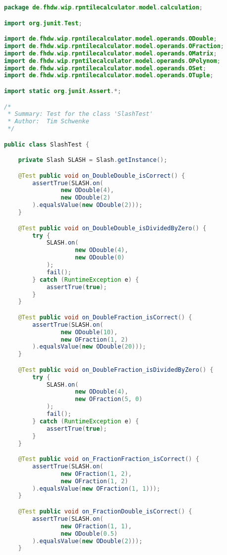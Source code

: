 \begin{lstlisting}[caption=SlashTest (Schwenke),label=list:SlashTest,language=Java]
package de.fhdw.wip.rpntilecalculator.model.calculation;

import org.junit.Test;

import de.fhdw.wip.rpntilecalculator.model.operands.ODouble;
import de.fhdw.wip.rpntilecalculator.model.operands.OFraction;
import de.fhdw.wip.rpntilecalculator.model.operands.OMatrix;
import de.fhdw.wip.rpntilecalculator.model.operands.OPolynom;
import de.fhdw.wip.rpntilecalculator.model.operands.OSet;
import de.fhdw.wip.rpntilecalculator.model.operands.OTuple;

import static org.junit.Assert.*;

/*
 * Summary: Test for the class 'SlashTest'
 * Author:  Tim Schwenke
 */

public class SlashTest {

    private Slash SLASH = Slash.getInstance();

    @Test public void on_DoubleDouble_isCorrect() {
        assertTrue(SLASH.on(
                new ODouble(4),
                new ODouble(2)
        ).equalsValue(new ODouble(2)));
    }

    @Test public void on_DoubleDouble_isDividedByZero() {
        try {
            SLASH.on(
                    new ODouble(4),
                    new ODouble(0)
            );
            fail();
        } catch (RuntimeException e) {
            assertTrue(true);
        }
    }

    @Test public void on_DoubleFraction_isCorrect() {
        assertTrue(SLASH.on(
                new ODouble(10),
                new OFraction(1, 2)
        ).equalsValue(new ODouble(20)));
    }

    @Test public void on_DoubleFraction_isDividedByZero() {
        try {
            SLASH.on(
                    new ODouble(4),
                    new OFraction(5, 0)
            );
            fail();
        } catch (RuntimeException e) {
            assertTrue(true);
        }
    }

    @Test public void on_FractionFraction_isCorrect() {
        assertTrue(SLASH.on(
                new OFraction(1, 2),
                new OFraction(1, 2)
        ).equalsValue(new OFraction(1, 1)));
    }

    @Test public void on_FractionDouble_isCorrect() {
        assertTrue(SLASH.on(
                new OFraction(1, 1),
                new ODouble(0.5)
        ).equalsValue(new ODouble(2)));
    }


\end{lstlisting}
